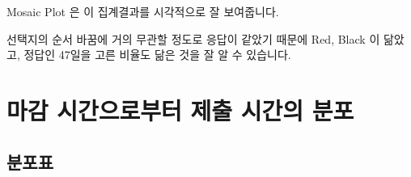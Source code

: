 \documentclass[
]{book}
\begin{document}
Mosaic Plot 은 이 집계결과를 시각적으로 잘 보여줍니다.

선택지의 순서 바꿈에 거의 무관할 정도로 응답이 같았기 때문에 Red, Black 이 닮았고, 정답인 47일을 고른 비율도 닮은 것을 잘 알 수 있습니다.

\section{마감 시간으로부터 제출 시간의 분포}\label{uxb9c8uxac10-uxc2dcuxac04uxc73cuxb85cuxbd80uxd130-uxc81cuxcd9c-uxc2dcuxac04uxc758-uxbd84uxd3ec-8}

\subsection{분포표}\label{uxbd84uxd3ecuxd45c-9}
\end{document}
